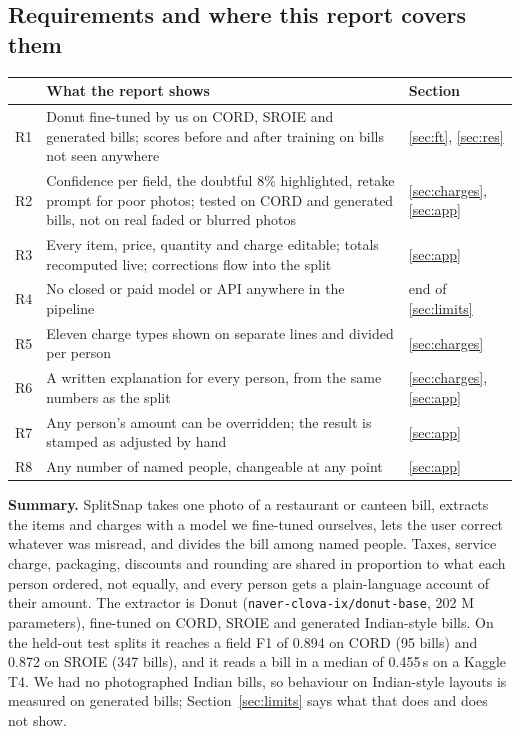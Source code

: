 \documentclass[10pt,a4paper]{article}
\begin{document}
\subsection*{Requirements and where this report covers them}
\begingroup\footnotesize
\begin{tabular}{@{}lp{10.6cm}l@{}}
\toprule
 & What the report shows & Section\\
\midrule
R1 & Donut fine-tuned by us on CORD, SROIE and generated bills; scores before and after training on bills not seen anywhere & \ref{sec:ft}, \ref{sec:res}\\
R2 & Confidence per field, the doubtful 8\% highlighted, retake prompt for poor photos; tested on CORD and generated bills, not on real faded or blurred photos & \ref{sec:charges}, \ref{sec:app}\\
R3 & Every item, price, quantity and charge editable; totals recomputed live; corrections flow into the split & \ref{sec:app}\\
R4 & No closed or paid model or API anywhere in the pipeline & end of \ref{sec:limits}\\
R5 & Eleven charge types shown on separate lines and divided per person & \ref{sec:charges}\\
R6 & A written explanation for every person, from the same numbers as the split & \ref{sec:charges}, \ref{sec:app}\\
R7 & Any person's amount can be overridden; the result is stamped as adjusted by hand & \ref{sec:app}\\
R8 & Any number of named people, changeable at any point & \ref{sec:app}\\
\bottomrule
\end{tabular}
\endgroup

\vspace{2pt}
\setcounter{tocdepth}{1}
\renewcommand{\contentsname}{Contents}
{\footnotesize\setlength{\parskip}{0pt}\tableofcontents}
\clearpage{}\setcounter{page}{1}

\textbf{Summary.}
SplitSnap takes one photo of a restaurant or canteen bill, extracts the items and charges with a model we fine-tuned ourselves, lets the user correct whatever was misread, and divides the bill among named people. Taxes, service charge, packaging, discounts and rounding are shared in proportion to what each person ordered, not equally, and every person gets a plain-language account of their amount. The extractor is Donut (\texttt{naver-clova-ix/donut-base}, 202 M parameters), fine-tuned on CORD, SROIE and generated Indian-style bills. On the held-out test splits it reaches a field F1 of 0.894 on CORD (95 bills) and 0.872 on SROIE (347 bills), and it reads a bill in a median of 0.455\,s on a Kaggle T4. We had no photographed Indian bills, so behaviour on Indian-style layouts is measured on generated bills; Section~\ref{sec:limits} says what that does and does not show.
\end{document}

